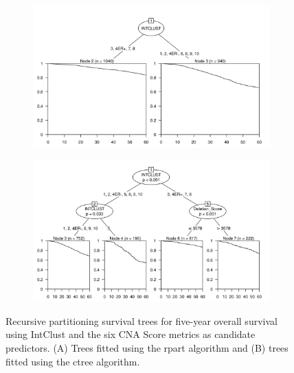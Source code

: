 \begin{figure}[!htb]
\centering

\vspace{0.5cm}

\begin{subfigure}{\textwidth}
\subcaption{}
\includegraphics[width=1\textwidth]{../figures/Appendices/Appendix_B/PartyKit_Survival_Score_FiveYearOS_INTCLUST.png}
\end{subfigure}

\vspace{2cm}

\begin{subfigure}{\textwidth}
\subcaption{}
\includegraphics[width=1\textwidth]{../figures/Appendices/Appendix_B/Ctree_Survival_Score_FiveYearOS_INTCLUST.png}
\end{subfigure}

\vspace{0.5cm}

\caption[Recursive partitioning survival trees for five-year overall survival using IntClust and the six CNA Score metrics as candidate predictors.]{Recursive partitioning survival trees for five-year overall survival using IntClust and the six CNA Score metrics as candidate predictors. (A) Trees fitted using the rpart algorithm and (B) trees fitted using the ctree algorithm.}
\end{figure}

